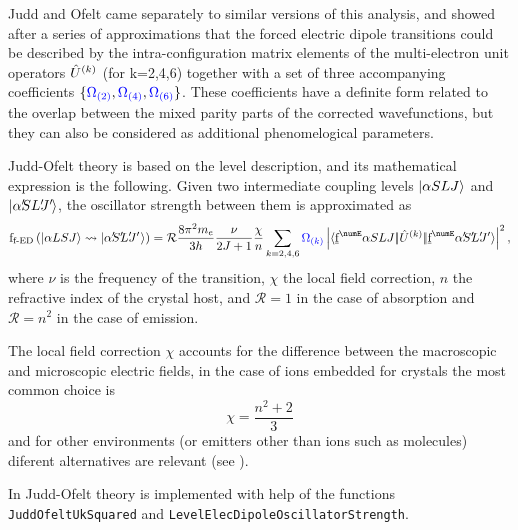 \documentclass{article}
\newcommand{\codetext}[1]{{\color{BlueViolet} \texttt{#1}}}
\begin{document}
Judd \cite{judd_optical_1962} and Ofelt \cite{ofelt_intensities_1962} came separately to similar versions of this analysis, and showed after a series of approximations that the forced electric dipole transitions could be described by the intra-configuration matrix elements of the multi-electron unit operators $\hat{U}^{(k)}$ (for k=2,4,6) together with a set of three accompanying coefficients $\{\textcolor{blue}{\Omega_{(2)}},\textcolor{blue}{\Omega_{(4)}},\textcolor{blue}{\Omega_{(6)}}\}$. These coefficients have a definite form related to the overlap between the mixed parity parts of the corrected wavefunctions, but they can also be considered as additional phenomelogical parameters.

Judd-Ofelt theory is based on the level description, and its mathematical expression is the following. Given two intermediate coupling levels $|\alpha SLJ\rangle$ and $\ket{\alpha\mathrlap{'} SL\mathrlap{'}J\mathrlap{'}\,}$, the oscillator strength between them is approximated as \cite{judd_optical_1962} 
\begin{equation}
\oStrength{f-ED}{\alpha{LSJ}}{\alpha\mathrlap{'} S\mathrlap{'} L\mathrlap{'} J\mathrlap{'}\,\,} = 
	\mathcal{R} \frac{8 \pi^2 m_e}{3 h}
	\frac{\nu}{\tpo{J}}
	\frac{\chi}{n} 
	\sum_{k=2,4,6}
		\JOk{k} 
		\left|
			\redbraopket{\forb^\numE \alpha SLJ}
				{\op{U}^{(k)}}
				{\forb^\numE \alpha\mathrlap{'} S\mathrlap{'} L\mathrlap{'} J'} 
		\right|^2,
\label{eqn:forced-dipole-judd-ofelt}
\end{equation}
where $\nu$ is the frequency of the transition, $\chi$ the local field correction, $n$ the refractive index of the crystal host, and $\mathcal{R} = 1$ in the case of absorption and $\mathcal{R} = n^2$ in the case of emission. 

The local field correction $\chi$ accounts for the difference between the macroscopic and microscopic electric fields, in the case of ions embedded for crystals the most common choice is 
\begin{equation}
	\chi = \frac{n^2+2}{3}  
\end{equation}
and for other environments (or emitters other than ions such as molecules) diferent alternatives are relevant (see \cite{duan_dependence_2006}).

In \qlanth Judd-Ofelt theory is implemented with help of the functions \codetext{JuddOfeltUkSquared} and \codetext{LevelElecDipoleOscillatorStrength}.

 

 
\end{document}

